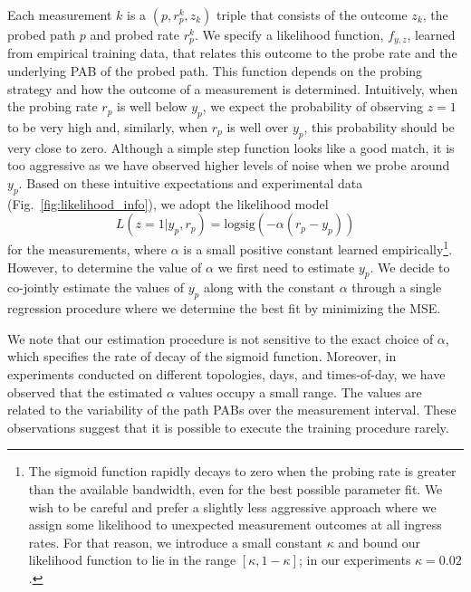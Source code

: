 \documentclass[final,5p,times,twocolumn]{elsarticle}
\begin{document}
Each measurement $k$ is a $(p,r_{p}^k,z_{k})$ triple that consists of the outcome $z_{k}$, the probed path $p$ and probed rate $r_{p}^k$.  We specify a likelihood function, $f_{y,z}$, learned from empirical training data, that relates this outcome to the probe rate and the underlying PAB of the probed path.  This function depends on the probing strategy and how the outcome of a measurement is determined.  Intuitively, when the probing rate $r_p$ is well below $y_p$, we expect the probability of observing $z=1$ to be very high and, similarly, when $r_p$ is well over $y_p$, this probability should be very close to zero.  Although a simple step function looks like a good match, it is too aggressive as we have observed higher levels of noise when we probe around $y_p$.  Based on these intuitive expectations and experimental data (Fig.~\ref{fig:likelihood_info}), we adopt the likelihood model $$L(z=1|y_p,r_p)={\mathrm{logsig}}(-\alpha(r_p-y_p))$$ for the measurements, where $\alpha$ is a small positive constant learned empirically\footnote{The sigmoid function rapidly decays to zero when the probing rate is greater than the available bandwidth, even for the best possible parameter fit.  We wish to be careful and prefer a slightly less aggressive approach where we assign some likelihood to unexpected measurement outcomes at all ingress rates.  For that reason, we introduce a small constant $\kappa$ and bound our likelihood function to lie in the range $[\kappa ,1-\kappa ]$; in our experiments $\kappa = 0.02$.}.  However, to determine the value of $\alpha$ we first need to estimate $y_p$.  We decide to co-jointly estimate the values of $y_p$ along with the constant $\alpha$ through a single regression procedure where we determine the best fit by minimizing the MSE. 

We note that our estimation procedure is not sensitive to the exact choice of $\alpha$, which specifies the rate of decay of the sigmoid function. Moreover, in experiments conducted on different topologies, days, and times-of-day, we have observed that the estimated $\alpha$ values occupy a small range. The values are related to the variability of the path PABs over the measurement interval. These observations suggest that it is possible to execute the training procedure rarely.
\end{document}
